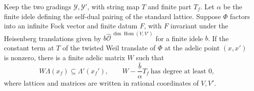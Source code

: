 \begin{lemma}
\label{lem:a-frequency-negative-degree}
\emitthmsource
Keep the two gradings $\mathcal Y,\mathcal Y'$, with string map $T$ and finite part $T_f$. Let $\alpha$ be the finite idele defining the self-dual pairing of the standard lattice. Suppose $\Phi$ factors into an infinite Fock vector and finite datum $F$, with $F$ invariant under the Heisenberg translations given by $b\widehat{\mathcal O}^{\,\dim\operatorname{Hom}(V,V')}$ for a finite idele $b$. If the constant term at $T$ of the twisted Weil translate of $\Phi$ at the adelic point $(x,x')$ is nonzero, there is a finite adelic matrix $W$ such that
\[
  W\Lambda(x_f)\subseteq\Lambda'(x_f'),
  \qquad
  W-\frac{\bar b}{\alpha}T_f\ \text{has degree at least }0 ,
\]
where lattices and matrices are written in rational coordinates of $V,V'$.
\end{lemma}
